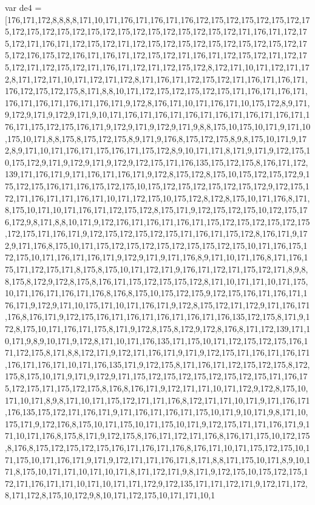 var de4 = [176,171,172,8,8,8,8,171,10,171,176,171,176,171,176,172,175,172,175,172,175,172,175,172,175,172,175,172,175,172,175,172,175,172,175,172,175,172,171,176,171,172,175,172,171,176,171,172,175,172,171,172,175,172,175,172,175,172,175,172,175,172,175,172,176,175,172,176,171,176,171,172,175,172,171,176,171,172,175,172,171,172,175,172,171,172,175,172,171,176,171,172,171,172,175,172,8,172,171,10,171,172,171,172,8,171,172,171,10,171,172,171,172,8,171,176,171,172,175,172,171,176,171,176,171,176,172,175,172,175,8,171,8,8,10,171,172,175,172,175,172,175,171,176,171,176,171,176,171,176,171,176,171,176,171,9,172,8,176,171,10,171,176,171,10,175,172,8,9,171,9,172,9,171,9,172,9,171,9,10,171,176,171,176,171,176,171,176,171,176,171,176,171,176,171,175,172,175,176,171,9,172,9,171,9,172,9,171,9,8,8,175,10,175,10,171,9,171,10,175,10,171,8,8,175,8,175,172,175,8,9,171,9,176,8,175,172,175,8,9,8,175,10,171,9,172,8,9,171,10,171,176,171,175,176,171,175,172,8,9,10,171,171,8,171,9,171,9,172,175,10,175,172,9,171,9,172,9,171,9,172,9,172,175,171,176,135,175,172,175,8,176,171,172,139,171,176,171,9,171,176,171,176,171,9,172,8,175,172,8,175,10,175,172,175,172,9,175,172,175,176,171,176,175,172,175,10,175,172,175,172,175,172,175,172,9,172,175,172,171,176,171,171,176,171,10,171,172,175,10,175,172,8,172,8,175,10,171,176,8,171,8,175,10,171,10,171,176,171,172,175,172,8,175,171,9,172,175,172,175,10,172,175,176,172,9,8,171,8,8,10,171,9,172,176,171,176,171,176,171,175,172,175,172,175,172,175,172,175,171,176,171,9,172,175,172,175,172,175,171,176,171,175,172,8,176,171,9,172,9,171,176,8,175,10,171,175,172,175,172,175,172,175,175,172,175,10,171,176,175,172,175,10,171,176,171,176,171,9,172,9,171,9,171,176,8,9,171,10,171,176,8,171,176,175,171,172,175,171,8,175,8,175,10,171,172,171,9,176,171,172,171,175,172,171,8,9,8,8,175,8,172,9,172,8,175,8,176,171,175,172,175,175,172,8,171,10,171,171,10,171,175,10,171,176,171,176,171,176,8,176,8,175,10,175,172,175,9,172,175,176,171,176,171,176,171,9,172,9,171,10,175,171,10,171,176,171,9,172,8,175,172,171,172,9,171,176,171,176,8,176,171,9,172,175,176,171,176,171,176,171,176,171,176,135,172,175,8,171,9,172,8,175,10,171,176,171,175,8,171,9,172,8,175,8,172,9,172,8,176,8,171,172,139,171,10,171,9,8,9,10,171,9,172,8,171,10,171,176,135,171,175,10,171,172,175,172,175,176,171,172,175,8,171,8,8,172,171,9,172,171,176,171,9,171,9,172,175,171,176,171,176,171,176,171,176,171,10,171,176,135,171,9,172,175,8,171,176,171,172,175,172,175,8,172,175,8,175,10,171,9,171,9,172,9,171,175,172,175,172,175,172,175,172,175,171,176,175,172,175,171,175,172,175,8,176,8,176,171,9,172,171,171,10,171,172,9,172,8,175,10,171,10,171,8,9,8,171,10,171,175,172,171,171,176,8,172,171,171,10,171,9,171,176,171,176,135,175,172,171,176,171,9,171,176,171,176,171,175,10,171,9,10,171,9,8,171,10,175,171,9,172,176,8,175,10,171,175,10,171,175,10,171,9,172,175,171,171,176,171,9,171,10,171,176,8,175,8,171,9,172,175,8,176,171,172,171,176,8,176,171,175,10,172,175,8,176,8,175,172,175,172,175,176,171,176,171,176,8,176,171,10,171,175,172,175,10,171,175,10,171,176,171,9,171,9,172,171,171,176,171,8,171,8,8,171,175,10,171,8,9,10,171,8,175,10,171,171,10,171,10,171,8,171,172,171,9,8,171,9,172,175,10,175,172,175,172,171,176,171,171,10,171,10,171,171,172,9,172,135,171,171,172,171,9,172,171,172,8,171,172,8,175,10,172,9,8,10,171,172,175,10,171,171,10,1